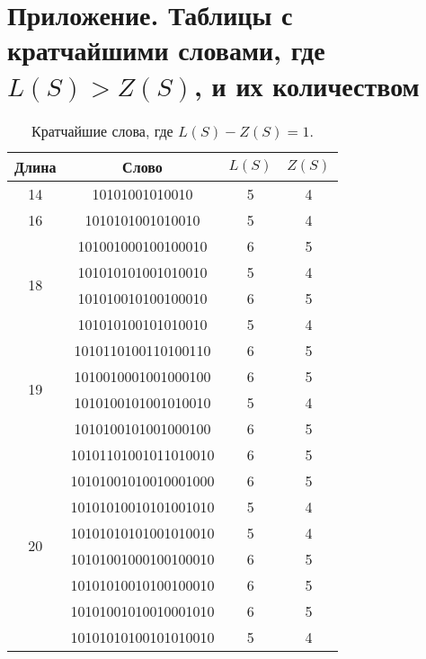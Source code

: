 \newpage
\appendix
\section*{Приложение. Таблицы с кратчайшими словами, где $ L(S) > Z(S) $, и их количеством}

\begin{table}[h]
\caption{Кратчайшие слова, где $ L(S) - Z(S) = 1 $.}
\begin{center}
\begin{tabular}{|c|c|c|c|}
\hline
Длина &
Слово &
$L(S)$ &
$Z(S)$ \\
\hline
14 & 10101001010010 & 5 & 4 \\
\hline
16 & 1010101001010010 & 5 & 4 \\
\hline
\multirow{4}{*}{18} & 101001000100100010 & 6 & 5 \\
                    & 101010101001010010 & 5 & 4 \\
                    & 101010010100100010 & 6 & 5 \\
                    & 101010100101010010 & 5 & 4 \\
\hline
\multirow{4}{*}{19} & 1010110100110100110 & 6 & 5 \\
                    & 1010010001001000100 & 6 & 5 \\
                    & 1010100101001010010 & 5 & 4 \\
                    & 1010100101001000100 & 6 & 5 \\
\hline
\multirow{8}{*}{20} & 10101101001011010010 & 6 & 5 \\
                    & 10101001010010001000 & 6 & 5 \\
                    & 10101010010101001010 & 5 & 4 \\
                    & 10101010101001010010 & 5 & 4 \\
                    & 10101001000100100010 & 6 & 5 \\
                    & 10101010010100100010 & 6 & 5 \\
                    & 10101001010010001010 & 6 & 5 \\
                    & 10101010100101010010 & 5 & 4 \\
\hline
\end{tabular}
\end{center}
\end{table}

